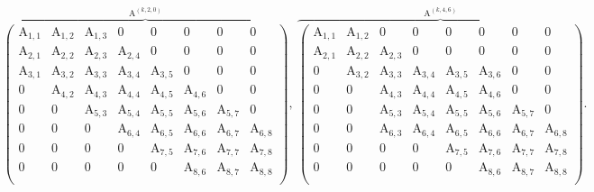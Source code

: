 \documentclass{article}
\newcommand\matA{\boldsymbol{\mathrm{A}}}
\begin{document}
\begin{align}
    \label{eq:block_pentadiagonal}
    \overbrace{
        \begin{pmatrix}
            \matA_{1,1}  & \matA_{1,2}  &\matA_{1,3}   & 0             & 0           & 0           & 0           & 0           \\
            \matA_{2,1}  & \matA_{2,2}  &\matA_{2,3}   & \matA_{2,4}   & 0           & 0           & 0           & 0           \\
            \matA_{3,1}  & \matA_{3,2}  &\matA_{3,3}   & \matA_{3,4}   & \matA_{3,5} & 0           & 0           & 0           \\
            0            & \matA_{4,2}  &\matA_{4,3}   & \matA_{4,4}   & \matA_{4,5} & \matA_{4,6} & 0           & 0           \\
            0            & 0            &\matA_{5,3}   & \matA_{5,4}   & \matA_{5,5} & \matA_{5,6} & \matA_{5,7} & 0           \\
            0            & 0            & 0            & \matA_{6,4}   & \matA_{6,5} & \matA_{6,6} & \matA_{6,7} & \matA_{6,8} \\
            0            & 0            & 0            & 0             & \matA_{7,5} & \matA_{7,6} & \matA_{7,7} & \matA_{7,8} \\
            0            & 0            & 0            & 0             & 0           & \matA_{8,6} & \matA_{8,7} & \matA_{8,8} \\
        \end{pmatrix}
    }^{
        \matA^{(k,2,0)}
    },
    \ 
    \overbrace{
    \begin{pmatrix}
        \matA_{1,1}  & \matA_{1,2}  & 0            & 0             & 0           & 0           & 0           & 0           \\
        \matA_{2,1}  & \matA_{2,2}  &\matA_{2,3}   & 0             & 0           & 0           & 0           & 0           \\
        0            & \matA_{3,2}  &\matA_{3,3}   & \matA_{3,4}   & \matA_{3,5} & \boxed{\matA_{3,6}} & 0           & 0           \\
        0            & 0            &\matA_{4,3}   & \matA_{4,4}   & \matA_{4,5} & \matA_{4,6} & 0           & 0           \\
        0            & 0            &\matA_{5,3}   & \matA_{5,4}   & \matA_{5,5} & \matA_{5,6} & \matA_{5,7} & 0           \\
        0            & 0            &\boxed{\matA_{6,3}}   & \matA_{6,4}   & \matA_{6,5} & \matA_{6,6} & \matA_{6,7} & \matA_{6,8} \\
        0            & 0            & 0            & 0             & \matA_{7,5} & \matA_{7,6} & \matA_{7,7} & \matA_{7,8} \\
        0            & 0            & 0            & 0             & 0           & \matA_{8,6} & \matA_{8,7} & \matA_{8,8} \\
    \end{pmatrix}}
    ^{
        \matA^{(k,4,6)}
    }
    .
\end{align}
\normalsize
\endgroup
\end{document}
